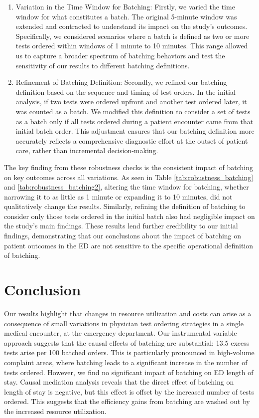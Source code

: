 \documentclass[,,nonblindrev]{informs}
\begin{document}
\begin{enumerate}
\def\labelenumi{(\arabic{enumi})}
\item
  Variation in the Time Window for Batching: Firstly, we varied the time
  window for what constitutes a batch. The original 5-minute window was
  extended and contracted to understand its impact on the study's
  outcomes. Specifically, we considered scenarios where a batch is
  defined as two or more tests ordered within windows of 1 minute to 10
  minutes. This range allowed us to capture a broader spectrum of
  batching behaviors and test the sensitivity of our results to
  different batching definitions.
\item
  Refinement of Batching Definition: Secondly, we refined our batching
  definition based on the sequence and timing of test orders. In the
  initial analysis, if two tests were ordered upfront and another test
  ordered later, it was counted as a batch. We modified this definition
  to consider a set of tests as a batch only if all tests ordered during
  a patient encounter came from that initial batch order. This
  adjustment ensures that our batching definition more accurately
  reflects a comprehensive diagnostic effort at the outset of patient
  care, rather than incremental decision-making.
\end{enumerate}

The key finding from these robustness checks is the consistent impact of
batching on key outcomes across all variations. As seen in Table
\ref{tab:robustness_batching} and \ref{tab:robustness_batching2},
altering the time window for batching, whether narrowing it to as little
as 1 minute or expanding it to 10 minutes, did not qualitatively change
the results. Similarly, refining the definition of batching to consider
only those tests ordered in the initial batch also had negligible impact
on the study's main findings. These results lend further credibility to
our initial findings, demonstrating that our conclusions about the
impact of batching on patient outcomes in the ED are not sensitive to
the specific operational definition of batching.

\hypertarget{conclusion}{%
\section{Conclusion}\label{conclusion}}

Our results highlight that changes in resource utilization and costs can
arise as a consequence of small variations in physician test ordering
strategies in a single medical encounter, at the emergency department.
Our instrumental variable approach suggests that the causal effects of
batching are substantial: 13.5 excess tests arise per 100 batched
orders. This is particularly pronounced in high-volume complaint areas,
where batching leads to a significant increase in the number of tests
ordered. However, we find no significant impact of batching on ED length
of stay. Causal mediation analysis reveals that the direct effect of
batching on length of stay is negative, but this effect is offset by the
increased number of tests ordered. This suggests that the efficiency
gains from batching are washed out by the increased resource
utilization.
\end{document}
